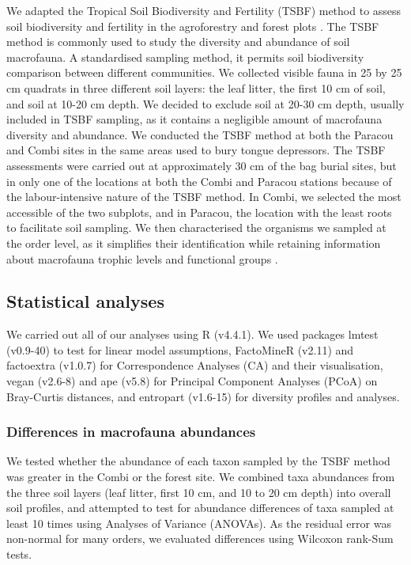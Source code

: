 \documentclass[fleqn,10pt]{ArtEcoFoG} %
\begin{document}
We adapted the Tropical Soil Biodiversity and Fertility (TSBF) method to assess soil biodiversity and fertility in the agroforestry and forest plots \citep{anderson_tropical_1989}. The TSBF method is commonly used to study the diversity and abundance of soil macrofauna. A standardised sampling method, it permits soil biodiversity comparison between different communities. We collected visible fauna in 25 by 25 cm quadrats in three different soil layers: the leaf litter, the first 10 cm of soil, and soil at 10-20 cm depth. We decided to exclude soil at 20-30 cm depth, usually included in TSBF sampling, as it contains a negligible amount of macrofauna diversity and abundance. We conducted the TSBF method at both the Paracou and Combi sites in the same areas used to bury tongue depressors. The TSBF assessments were carried out at approximately 30 cm of the bag burial sites, but in only one of the locations at both the Combi and Paracou stations because of the labour-intensive nature of the TSBF method. In Combi, we selected the most accessible of the two subplots, and in Paracou, the location with the least roots to facilitate soil sampling. We then characterised the organisms we sampled at the order level, as it simplifies their identification while retaining information about macrofauna trophic levels and functional groups \citep[following,][]{decaens_identification_2015}.

\subsection{Statistical analyses}\label{statistical-analyses}

We carried out all of our analyses using R (v4.4.1). We used packages lmtest (v0.9-40) to test for linear model assumptions, FactoMineR (v2.11) and factoextra (v1.0.7) for Correspondence Analyses (CA) and their visualisation, vegan (v2.6-8) and ape (v5.8) for Principal Component Analyses (PCoA) on Bray-Curtis distances, and entropart (v1.6-15) for diversity profiles and analyses.

\subsubsection{Differences in macrofauna abundances}\label{differences-in-macrofauna-abundances}

We tested whether the abundance of each taxon sampled by the TSBF method was greater in the Combi or the forest site. We combined taxa abundances from the three soil layers (leaf litter, first 10 cm, and 10 to 20 cm depth) into overall soil profiles, and attempted to test for abundance differences of taxa sampled at least 10 times using Analyses of Variance (ANOVAs). As the residual error was non-normal for many orders, we evaluated differences using Wilcoxon rank-Sum tests.
\end{document}
